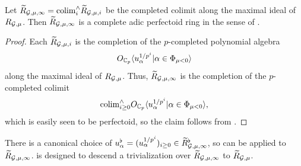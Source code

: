 \documentclass[12pt,reqno]{amsart}
\begin{document}
\begin{lem}
    Let ${\widetilde{R}}_{{\mathcal{G}}, \mu, \infty} = {\operatorname{colim}}_{i}^\wedge {\widetilde{R}}_{{\mathcal{G}}, \mu, i}$ be the completed colimit along the maximal ideal of $R_{{\mathcal{G}}, \mu}$. Then ${\widetilde{R}}_{{\mathcal{G}}, \mu, \infty}$ is a complete adic perfectoid ring in the sense of \textup{\cite[Definition 4.4]{Tak26_rel}}.
\end{lem}
\begin{proof}
    Each ${\widetilde{R}}_{{\mathcal{G}}, \mu, i}$ is the completion of the $p$-completed polynomial algebra 
    \[
        O_{\mathbb{C}_p} \langle u_\alpha^{1 / p^i} \vert \alpha \in \Phi_{\mu < 0} \rangle
    \]
    along the maximal ideal of $R_{{\mathcal{G}}, \mu}$. Thus, ${\widetilde{R}}_{{\mathcal{G}}, \mu, \infty}$ is the completion of the $p$-completed colimit
    \[
        {\operatorname{colim}}_{i \geq 0}^\wedge O_{\mathbb{C}_p} \langle u_\alpha^{1 / p^i} \vert \alpha \in \Phi_{\mu < 0} \rangle, 
    \]
    which is easily seen to be perfectoid, so the claim follows from \cite[Corollary 4.11]{Tak26_rel}. 
\end{proof}

There is a canonical choice of $u_\alpha^\flat = (u_\alpha^{1/p^i})_{i \geq 0} \in {\widetilde{R}}_{{\mathcal{G}}, \mu, \infty}^\flat$, so  can be applied to ${\widetilde{R}}_{{\mathcal{G}}, \mu, \infty}$.  is designed to descend a trivialization over ${\widetilde{R}}_{{\mathcal{G}}, \mu, \infty}$ to ${\widetilde{R}}_{{\mathcal{G}}, \mu}$. 
\end{document}
